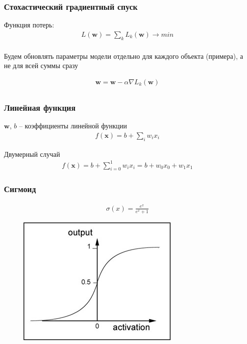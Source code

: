 \documentclass[fullscreen=true, bookmarks=false]{beamer} %
\begin{document}

\begin{frame}{}
 \frametitle{Стохастический градиентный спуск}
 
 Функция потерь:
 \begin{gather*}
 \nonumber
 L(\bm{w}) = \sum_k L_k(\bm{w}) \rightarrow min\\
 \end{gather*}

Будем обновлять параметры модели отдельно для каждого объекта (примера), а не для всей суммы сразу

\begin{gather*}
\nonumber
 \bm{w} = \bm{w} - \alpha \nabla L_k(\bm{w})\\
\end{gather*}

\end{frame}


\begin{frame}{}
 \frametitle{Линейная функция}
 $\bm{w}$, $b$ -- коэффициенты линейной функции
\begin{gather*}
\nonumber
f(\bm{x}) = b + \sum_i w_i x_i
\end{gather*}

Двумерный случай
\begin{gather*}
\nonumber
f(\bm{x}) = b + \sum_{i=0}^1 w_i x_i= b + w_0 x_0 + w_1 x_1
\end{gather*}

\end{frame}


\begin{frame}{}
 \frametitle{Сигмоид}
\begin{gather*}
\nonumber
\sigma(x) = \frac{e^x}{e^x + 1}
\end{gather*}
\begin{figure}[]
\includegraphics[scale=0.5]{sigmoid} 
\end{figure}

\end{frame}
\end{document}
